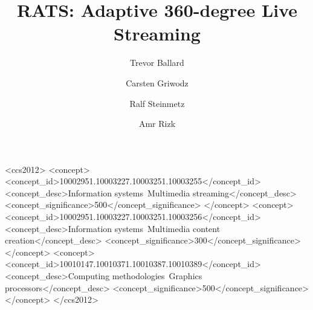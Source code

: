 \documentclass[sigconf]{acmart}
\begin{document}
\title{RATS: Adaptive 360-degree Live Streaming}

\author{Trevor Ballard}

\author{Carsten Griwodz}

\author{Ralf Steinmetz}

\author{Amr Rizk}


\begin{abstract}

\end{abstract}

%
%
 \begin{CCSXML}
	<ccs2012>
	<concept>
	<concept_id>10002951.10003227.10003251.10003255</concept_id>
	<concept_desc>Information systems~Multimedia streaming</concept_desc>
	<concept_significance>500</concept_significance>
	</concept>
	<concept>
	<concept_id>10002951.10003227.10003251.10003256</concept_id>
	<concept_desc>Information systems~Multimedia content creation</concept_desc>
	<concept_significance>300</concept_significance>
	</concept>
	<concept>
	<concept_id>10010147.10010371.10010387.10010389</concept_id>
	<concept_desc>Computing methodologies~Graphics processors</concept_desc>
	<concept_significance>500</concept_significance>
	</concept>
	</ccs2012>
\end{CCSXML}

%
%


\maketitle





\end{document}
